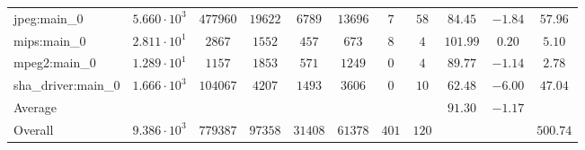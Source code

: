 \begin{tabular}{|l|c|c|c|c|c|c|c|c|c|c|}
jpeg:main\_0            & $ 5.660 \cdot 10^{3} $ & $ 477960 $ & $ 19622 $ & $ 6789  $ & $ 13696 $ & $ 7   $ & $ 58  $ & $ 84.45       $ & $ -1.84   $ & $ 57.96   $ \\
mips:main\_0            & $ 2.811 \cdot 10^{1} $ & $ 2867   $ & $ 1552  $ & $ 457   $ & $ 673   $ & $ 8   $ & $ 4   $ & $ 101.99      $ & $ 0.20    $ & $ 5.10    $ \\
mpeg2:main\_0           & $ 1.289 \cdot 10^{1} $ & $ 1157   $ & $ 1853  $ & $ 571   $ & $ 1249  $ & $ 0   $ & $ 4   $ & $ 89.77       $ & $ -1.14   $ & $ 2.78    $ \\
sha\_driver:main\_0     & $ 1.666 \cdot 10^{3} $ & $ 104067 $ & $ 4207  $ & $ 1493  $ & $ 3606  $ & $ 0   $ & $ 10  $ & $ 62.48       $ & $ -6.00   $ & $ 47.04   $ \\
\hline
Average                 & $                    $ & $        $ & $       $ & $       $ & $       $ & $     $ & $     $ & $ 91.30       $ & $ -1.17   $ & $         $ \\
\hline
Overall                 & $ 9.386 \cdot 10^{3} $ & $ 779387 $ & $ 97358 $ & $ 31408 $ & $ 61378 $ & $ 401 $ & $ 120 $ & $             $ & $         $ & $ 500.74  $ \\
\hline
\end{tabular}
